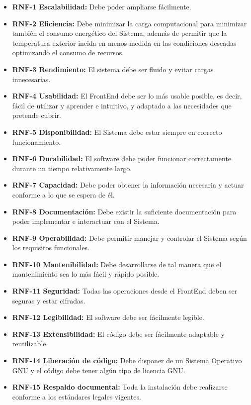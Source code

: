 \begin{itemize}
    \item \textbf{RNF-1 Escalabilidad:} Debe poder ampliarse fácilmente.
    \item \textbf{RNF-2 Eficiencia:} Debe minimizar la carga computacional para minimizar también el consumo energético del Sistema, además de permitir que la temperatura exterior incida en menos medida en las condiciones deseadas optimizando el consumo de recursos.
    \item \textbf{RNF-3 Rendimiento:} El sistema debe ser fluido y evitar cargas innecesarias.
    \item \textbf{RNF-4 Usabilidad:} El FrontEnd debe ser lo más usable posible, es decir, fácil de utilizar y aprender e intuitivo, y adaptado a las necesidades que pretende cubrir.
    \item \textbf{RNF-5 Disponibilidad:} El Sistema debe estar siempre en correcto funcionamiento.
    \item \textbf{RNF-6 Durabilidad:} El software debe poder funcionar correctamente durante un tiempo relativamente largo.
    \item \textbf{RNF-7 Capacidad:} Debe poder obtener la información necesaria y actuar conforme a lo que se espera de él.
    \item \textbf{RNF-8 Documentación:} Debe existir la suficiente documentación para poder implementar e interactuar con el Sistema.
    \item \textbf{RNF-9 Operabilidad:} Debe permitir manejar y controlar el Sistema según los requisitos funcionales.
    \item \textbf{RNF-10 Mantenibilidad:} Debe desarrollarse de tal manera que el mantenimiento sea lo más fácil y rápido posible.
    \item \textbf{RNF-11 Seguridad:} Todas las operaciones desde el FrontEnd deben ser seguras y estar cifradas.
    \item \textbf{RNF-12 Legibilidad:} El software debe ser fácilmente legible.
    \item \textbf{RNF-13 Extensibilidad:} El código debe ser fácilmente adaptable y reutilizable.
    \item \textbf{RNF-14 Liberación de código:} Debe disponer de un Sistema Operativo GNU y el código debe tener algún tipo de licencia GNU.
    \item \textbf{RNF-15 Respaldo documental:} Toda la instalación debe realizarse conforme a los estándares legales vigentes.
~\\~\\~\\~\\
\end{itemize}

